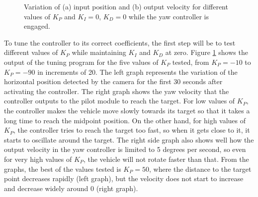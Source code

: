 \begin{figure}
  \centering
  \caption{Variation of (a) input position and (b) output velocity for different values of $K_{P}$ and $K_I=0$, $K_D=0$ while the yaw controller is engaged.}\label{fig:tune-yaw-prop}
\end{figure}

To tune the controller to its correct coefficients, the first step will be to test different values of $K_{P}$ while maintaining $K_{I}$ and $K_{D}$ at zero.
Figure \ref{fig:tune-yaw-prop} shows the output of the tuning program for the five values of $K_{P}$ tested, from $K_P=-10$ to $K_P=-90$ in increments of 20.
The left graph represents the variation of the horizontal position detected by the camera for the first 30 seconds after activating the controller.
The right graph shows the yaw velocity that the controller outputs to the pilot module to reach the target.
For low values of $K_{P}$, the controller makes the vehicle move slowly towards its target so that it takes a long time to reach the midpoint position.
On the other hand, for high values of $K_{P}$, the controller tries to reach the target too fast, so when it gets close to it, it starts to oscillate around the target.
The right side graph also shows well how the output velocity in the yaw controller is limited to 5 degrees per second, so even for very high values of $K_P$, the vehicle will not rotate faster than that.
From the graphs, the best of the values tested is $K_{P}=50$, where the distance to the target point decreases rapidly (left graph), but the velocity does not start to increase and decrease widely around 0 (right graph).

